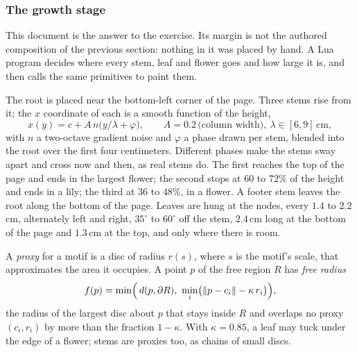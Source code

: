 \subsubsection{The growth stage}

This document is the answer to the exercise. Its margin is not the authored composition of
the previous section: nothing in it was placed by hand. A Lua program decides where every
stem, leaf and flower goes and how large it is, and then calls the same primitives to paint
them.

\begin{construction}[Stems]
The root is placed near the bottom-left corner of the page. Three stems rise from it; the
$x$ coordinate of each is a smooth function of the height,
\[
  x(y)=c+A\,n\bigl(y/\lambda+\varphi\bigr),
  \qquad A=0.2\,\text{(column width)},\ \lambda\in[6,9]\,\text{cm},
\]
with $n$ a two-octave gradient noise and $\varphi$ a phase drawn per stem, blended into the
root over the first four centimeters. Different phases make the stems sway apart and cross
now and then, as real stems do. The first reaches the top of the page and ends in the
largest flower; the second stops at $60$ to $72\%$ of the height and ends in a lily; the
third at $36$ to $48\%$, in a flower. A footer stem leaves the root along the bottom of the
page. Leaves are hung at the nodes, every $1.4$ to $2.2\,$cm, alternately left and right,
$35^\circ$ to $60^\circ$ off the stem, $2.4\,$cm long at the bottom of the page and $1.3\,$cm at
the top, and only where there is room.
\end{construction}

\begin{definition}
A \emph{proxy} for a motif is a disc of radius $r(s)$, where $s$ is the motif's scale, that
approximates the area it occupies. A point $p$ of the free region $R$ has \emph{free
radius}
\[
  f(p)=\min\Bigl(\,d(p,\partial R),\ \min_i\bigl(\lVert p-c_i\rVert-\kappa\,r_i\bigr)\Bigr),
\]
the radius of the largest disc about $p$ that stays inside $R$ and overlaps no proxy
$(c_i,r_i)$ by more than the fraction $1-\kappa$. With $\kappa=0.85$, a leaf may tuck under
the edge of a flower; stems are proxies too, as chains of small discs.
\end{definition}

